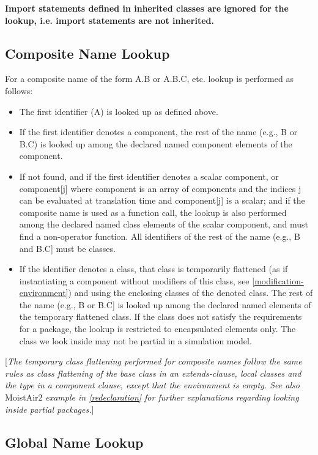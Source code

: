 \textbf{Import statements defined in inherited classes are ignored for
the lookup, i.e. import statements are not inherited.}

\subsection{Composite Name Lookup}

For a composite name of the form A.B or A.B.C, etc. lookup is performed
as follows:

\begin{itemize}
\item
  The first identifier (A) is looked up as defined above.
\item
  If the first identifier denotes a component, the rest of the name
  (e.g., B or B.C) is looked up among the declared named component
  elements of the component.
\item
  If not found, and if the first identifier denotes a scalar component,
  or component[j] where component is an array of components and the
  indices j can be evaluated at translation time and component[j] is
  a scalar; and if the composite name is used as a function call, the
  lookup is also performed among the declared named class elements of
  the scalar component, and must find a non-operator function. All
  identifiers of the rest of the name (e.g., B and B.C] must be
  classes.
\item
  If the identifier denotes a class, that class is temporarily flattened
  (as if instantiating a component without modifiers of this class, see
  \ref{modification-environment}) and using the enclosing classes of the denoted class.
  The rest of the name (e.g., B or B.C{]} is looked up among the
  declared named elements of the temporary flattened class. If the class
  does not satisfy the requirements for a package, the lookup is
  restricted to encapsulated elements only. The class we look inside may
  not be partial in a simulation model.
\end{itemize}

{[}\emph{The temporary class flattening performed for composite names
follow the same rules as class flattening of the base class in an
extends-clause, local classes and the type in a component clause, except
that the environment is empty. See also} MoistAir2 \emph{example in
\ref{redeclaration} for further explanations regarding looking inside
partial packages.}{]}

\subsection{Global Name Lookup}

